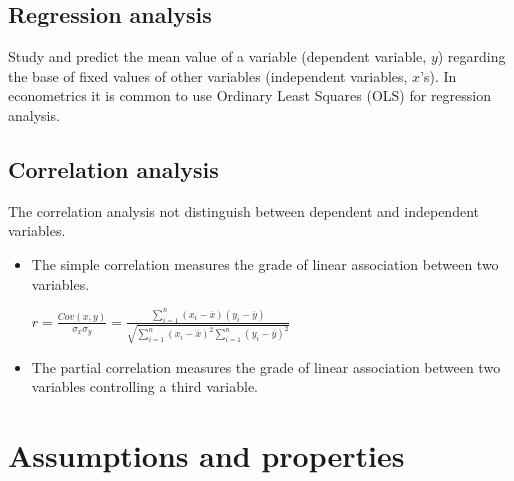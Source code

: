 \documentclass[10pt, a4paper, landscape]{extarticle}
\begin{document}
\begin{multicols}{3}
	\subsection*{Regression analysis}
		Study and predict the mean value of a variable (dependent variable, $y$) regarding the base of fixed values of other variables (independent variables, $x$'s). In econometrics it is common to use Ordinary Least Squares (OLS) for regression analysis.
	\subsection*{Correlation analysis}
		The correlation analysis not distinguish between dependent and independent variables.
		\begin{itemize}[leftmargin=*]
			\item The simple correlation measures the grade of linear association between two variables.
			\begin{center}
				$r = \frac{Cov(x,y)}{\sigma_x \sigma_y} = \frac{\sum_{i=1}^n (x_i - \overline{x})(y_i - \overline{y})}{\sqrt{\sum_{i=1}^n (x_i - \overline{x})^2 \sum_{i=1}^n (y_i - \overline{y})^2}}$
			\end{center}
			\item The partial correlation measures the grade of linear association between two variables controlling a third variable.
		\end{itemize}

\columnbreak

\section*{Assumptions and properties}

\end{multicols}
\end{document}

